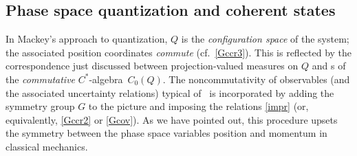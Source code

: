 \documentclass[12pt,titlepage]{article}
\newcommand{\ca}{$C^*$-algebra} \newcommand{\jba}{JB-algebra}
\newcommand{\er}{\eqref}
\begin{document}
\subsection{Phase space quantization and coherent states}\label{PSQ}
In Mackey's approach to quantization, $Q$ is the {\it configuration space} of the system; 
the associated position coordinates {\it commute} (cf.\ \er{Gccr3}).
This is reflected by the correspondence just discussed between  projection-valued measures on $Q$ and \rep s of the {\it commutative} \ca\ $C_0(Q)$. The noncommutativity of observables (and the associated uncertainty relations) typical of \qm\ is incorporated by adding the symmetry group $G$ to the picture and imposing the relations \er{impr} (or, equivalently, \er{Gccr2} or \er{Gcov}). As we have pointed out, this procedure upsets the symmetry between the phase space variables position and momentum in classical mechanics. 
\end{document}
